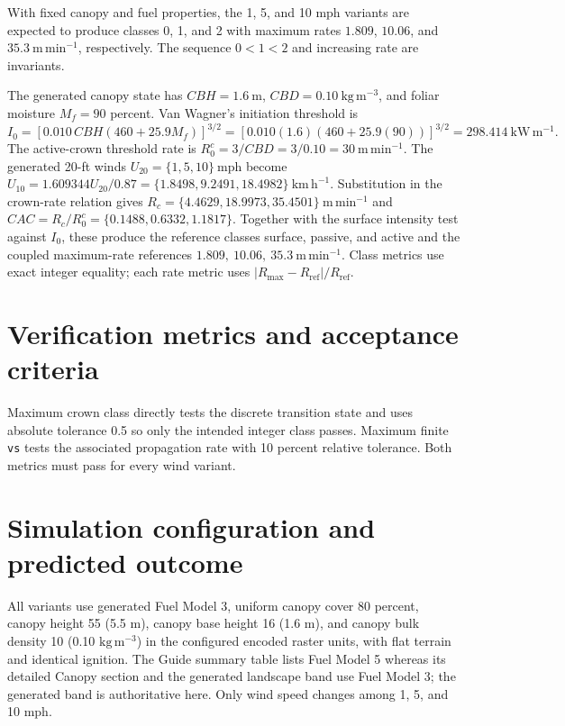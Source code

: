 With fixed canopy and fuel properties, the 1, 5, and 10 mph variants are expected to produce classes 0, 1, and 2 with maximum rates \(1.809\), \(10.06\), and \(35.3~\mathrm{m\,min^{-1}}\), respectively. The sequence \(0<1<2\) and increasing rate are invariants.

The generated canopy state has \(CBH=1.6~\mathrm{m}\),
\(CBD=0.10~\mathrm{kg\,m^{-3}}\), and foliar moisture \(M_f=90\) percent.
Van Wagner's initiation threshold is
\[
 I_0=\left[0.010\,CBH(460+25.9M_f)\right]^{3/2}
 =\left[0.010(1.6)(460+25.9(90))\right]^{3/2}
 =298.414~\mathrm{kW\,m^{-1}}.
\]
The active-crown threshold rate is \(R_0^{c}=3/CBD=3/0.10
=30~\mathrm{m\,min^{-1}}\).  The generated 20-ft winds
\(U_{20}=\{1,5,10\}~\mathrm{mph}\) become
\(U_{10}=1.609344U_{20}/0.87=\{1.8498,9.2491,18.4982\}~\mathrm{km\,h^{-1}}\).
Substitution in the crown-rate relation gives
\(R_c=\{4.4629,18.9973,35.4501\}~\mathrm{m\,min^{-1}}\) and
\(CAC=R_c/R_0^c=\{0.1488,0.6332,1.1817\}\).  Together with the surface
intensity test against \(I_0\), these produce the reference classes
surface, passive, and active and the coupled maximum-rate references
\(1.809,\ 10.06,\ 35.3~\mathrm{m\,min^{-1}}\).  Class metrics use exact
integer equality; each rate metric uses
\(|R_{\max}-R_{\mathrm{ref}}|/R_{\mathrm{ref}}\).

\section{Verification metrics and acceptance criteria}

Maximum crown class directly tests the discrete transition state and uses absolute tolerance 0.5 so only the intended integer class passes. Maximum finite \texttt{vs} tests the associated propagation rate with 10 percent relative tolerance. Both metrics must pass for every wind variant.

\section{Simulation configuration and predicted outcome}

All variants use generated Fuel Model 3, uniform canopy cover 80 percent, canopy height 55 (5.5 m), canopy base height 16 (1.6 m), and canopy bulk density 10 (0.10 \(\mathrm{kg\,m^{-3}}\)) in the configured encoded raster units, with flat terrain and identical ignition. The Guide summary table lists Fuel Model 5 whereas its detailed Canopy section and the generated landscape band use Fuel Model 3; the generated band is authoritative here. Only wind speed changes among 1, 5, and 10 mph.

